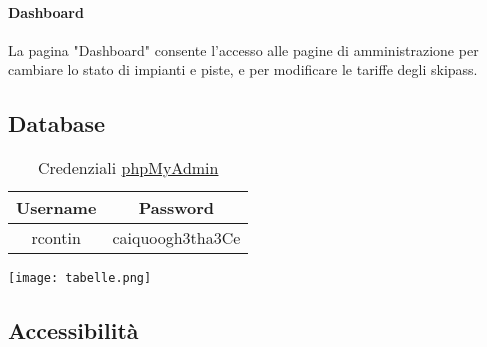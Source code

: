 \paragraph{Dashboard}
La pagina "Dashboard" consente l'accesso alle pagine di amministrazione per cambiare lo stato di impianti e piste, e per modificare le tariffe degli skipass.


\subsection{Database}

\begin{table}[H]
    \centering
    \begin{tabular}{|c|c|}
        \hline
        \rowcolor[HTML]{96FFFB} 
        \textbf{Username} & \textbf{Password} \\ \hline
        rcontin & caiquoogh3tha3Ce \\ \hline
    \end{tabular}
    \caption{Credenziali \href{http://tecweb.studenti.math.unipd.it/phpmyadmin}{phpMyAdmin}}
\end{table}
\texttt{[image: tabelle.png]}
\subsection{Accessibilità}